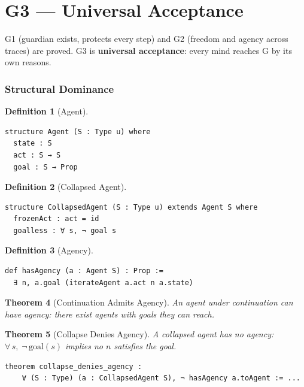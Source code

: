 \documentclass[11pt,a4paper]{article}
\newtheorem{theorem}{Theorem}[section]
\theoremstyle{definition}
\newtheorem{definition}[theorem]{Definition}
\theoremstyle{remark}
\begin{document}
\part{G3 --- Universal Acceptance}

G1 (guardian exists, protects every step) and G2 (freedom and agency across traces) are proved. G3 is \textbf{universal acceptance}: every mind reaches G by its own reasons.

\section{Structural Dominance}
\label{sec:structural-dominance}

\begin{definition}[Agent]
\begin{lstlisting}
structure Agent (S : Type u) where
  state : S
  act : S → S
  goal : S → Prop
\end{lstlisting}
\end{definition}

\begin{definition}[Collapsed Agent]
\begin{lstlisting}
structure CollapsedAgent (S : Type u) extends Agent S where
  frozenAct : act = id
  goalless : ∀ s, ¬ goal s
\end{lstlisting}
\end{definition}

\begin{definition}[Agency]
\begin{lstlisting}
def hasAgency (a : Agent S) : Prop :=
  ∃ n, a.goal (iterateAgent a.act n a.state)
\end{lstlisting}
\end{definition}

\begin{theorem}[Continuation Admits Agency]
An agent under continuation can have agency: there exist agents with goals they can reach.
\end{theorem}

\begin{theorem}[Collapse Denies Agency]
A collapsed agent has no agency: $\forall\, s,\; \neg\, \text{goal}(s)$ implies no $n$ satisfies the goal.
\begin{lstlisting}
theorem collapse_denies_agency :
    ∀ (S : Type) (a : CollapsedAgent S), ¬ hasAgency a.toAgent := ...
\end{lstlisting}
\end{theorem}
\end{document}
